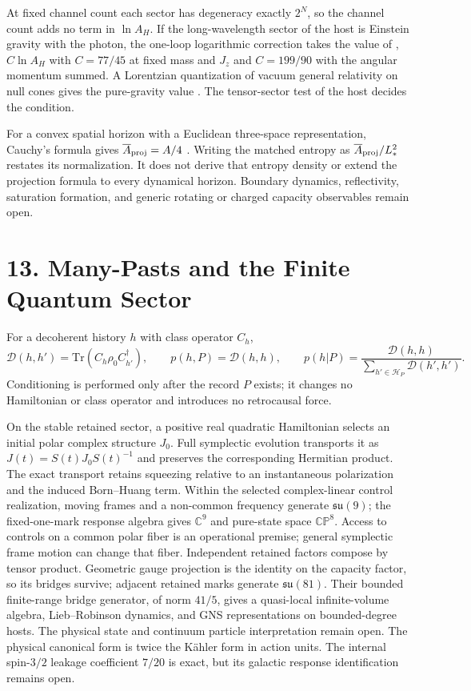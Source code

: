 \documentclass[11pt]{article}
\begin{document}
At fixed channel count each sector has degeneracy exactly \(2^N\),
so the channel count adds no term in \(\ln A_H\). If the
long-wavelength sector of the host is Einstein gravity with the
photon, the one-loop logarithmic correction takes the value of
\citet{Sen2013Log}, \(C\ln A_H\) with \(C=77/45\) at fixed mass and
\(J_z\) and \(C=199/90\) with the angular momentum summed. A
Lorentzian quantization of vacuum general relativity on null cones
gives the pure-gravity value \citep{Chandrasekaran2026Null}. The
tensor-sector test of the host decides the condition.

For a convex spatial horizon with a Euclidean three-space
representation, Cauchy's formula gives
\(\overline A_{\rm proj}=A/4\) \citep{TsukermanVeomett2016}.
Writing the matched entropy as
\(\overline A_{\rm proj}/L_*^2\) restates its normalization.
It does not derive that entropy density or extend the
projection formula to every dynamical horizon.
Boundary dynamics, reflectivity, saturation formation, and
generic rotating or charged capacity observables remain open.

\section{13. Many-Pasts and the Finite Quantum Sector}

For a decoherent history $h$ with class operator $C_h$,
\[
\mathcal D(h,h')=\mathrm{Tr}(C_h\rho_0C_{h'}^\dagger),
\qquad
p(h,P)=\mathcal D(h,h),
\qquad
p(h|P)=\frac{\mathcal D(h,h)}{\sum_{h'\in\mathcal H_P}\mathcal D(h',h')}.
\]
Conditioning is performed only after the record $P$ exists; it changes no Hamiltonian or class operator and introduces no retrocausal force.

On the stable retained sector, a positive real quadratic Hamiltonian selects an initial polar complex structure $J_0$. Full symplectic evolution transports it as $J(t)=S(t)J_0S(t)^{-1}$ and preserves the corresponding Hermitian product. The exact transport retains squeezing relative to an instantaneous polarization and the induced Born--Huang term. Within the selected complex-linear control realization, moving frames and a non-common frequency generate $\mathfrak{su}(9)$; the fixed-one-mark response algebra gives $\mathbb C^9$ and pure-state space $\mathbb{CP}^8$. Access to controls on a common polar fiber is an operational premise; general symplectic frame motion can change that fiber. Independent retained factors compose by tensor product. Geometric gauge projection is the identity on the capacity factor, so its bridges survive; adjacent retained marks generate $\mathfrak{su}(81)$. Their bounded finite-range bridge generator, of norm $41/5$, gives a quasi-local infinite-volume algebra, Lieb--Robinson dynamics, and GNS representations on bounded-degree hosts. The physical state and continuum particle interpretation remain open. The physical canonical form is twice the K\"ahler form in action units. The internal spin-$3/2$ leakage coefficient $7/20$ is exact, but its galactic response identification remains open.
\end{document}
